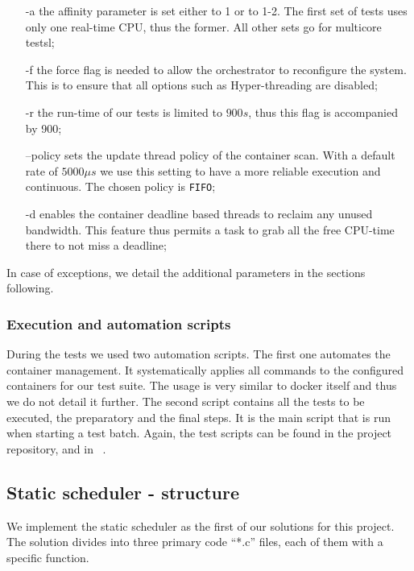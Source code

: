 \documentclass[]{scrartcl}
\begin{document}
\begin{itemize} %
	\item [-a] the affinity parameter is set either to 1 or to 1-2. The first set of tests uses only one real-time CPU, thus the former. All other sets go for multicore testsl;
	\item[-f] the force flag is needed to allow the orchestrator to reconfigure the system. This is to ensure that all options such as Hyper-threading are disabled;
	\item[-r] the run-time of our tests is limited to $900s$, thus this flag is accompanied by 900;
	\item[--policy]	sets the update thread policy of the container scan. With a default rate of $5000\mu s$ we use this setting to have a more reliable execution and continuous. The chosen policy is \texttt{FIFO};
	\item[-d] enables the container deadline based threads to reclaim any unused bandwidth. This feature thus permits a task to grab all the free CPU-time there to not miss a deadline; 
\end{itemize}

In case of exceptions, we detail the additional parameters in the sections following.

\subsubsection{Execution and automation scripts}
\label{sub:scripts}

During the tests we used two automation scripts. 
The first one automates the container management. It systematically applies all commands to the configured containers for our test suite. The usage is very similar to docker itself and thus we do not detail it further.
The second script contains all the tests to be executed, the preparatory and the final steps.
It is the main script that is run when starting a test batch.
%
Again, the test scripts can be found in the project repository, and in ~\cite{homep01}.

\subsection{Static scheduler - structure}

We implement the static scheduler as the first of our solutions for this project. 
The solution divides into three primary code ``*.c'' files, each of them with a specific function. 
\end{document}
